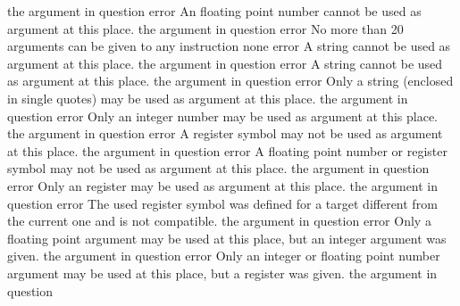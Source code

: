 \documentclass[12pt,twoside]{report}
\begin{document}
\begin{description}
               {the argument in question}
               {error}
               {An floating point number cannot be used as argument at this place.}
               {the argument in question}
               {error}
               {No more than 20 arguments can be given to any instruction}
               {none}
               {error}
               {A string cannot be used as argument at this place.}
               {the argument in question}
               {error}
               {A string cannot be used as argument at this place.}
               {the argument in question}
               {error}
               {Only a string (enclosed in single quotes) may be used as
                argument at this place.}
               {the argument in question}
               {error}
               {Only an integer number may be used as argument at this place.}
               {the argument in question}
               {error}
               {A register symbol may not be used as argument at this place.}
               {the argument in question}
               {error}
               {A floating point number or register symbol may not be used as argument at this place.}
               {the argument in question}
               {error}
               {Only an register may be used as argument at this place.}
               {the argument in question}
               {error}
               {The used register symbol was defined for a target different from
                the current one and is not compatible.}
               {the argument in question}
               {error}
               {Only a floating point argument may be used at this place,
                but an integer argument was given.}
               {the argument in question}
               {error}
               {Only an integer or floating point number argument may be used at this place,
                but a register was given.}
               {the argument in question}

\end{description}
\end{document}
